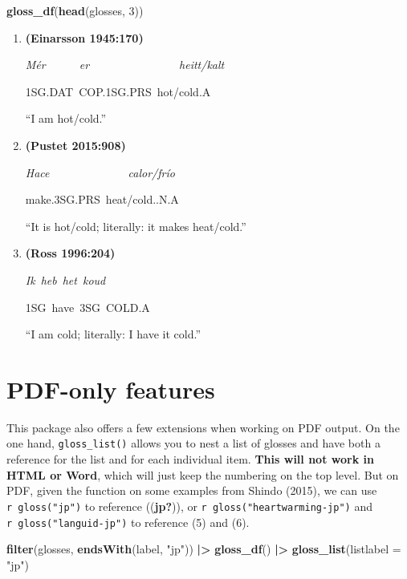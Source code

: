 \documentclass[
]{article}
\newenvironment{Shaded}{\begin{snugshade}}{\end{snugshade}}
\newcommand{\AttributeTok}[1]{\textcolor[rgb]{0.13,0.29,0.53}{#1}}
\newcommand{\DecValTok}[1]{\textcolor[rgb]{0.00,0.00,0.81}{#1}}
\newcommand{\FunctionTok}[1]{\textcolor[rgb]{0.13,0.29,0.53}{\textbf{#1}}}
\newcommand{\NormalTok}[1]{#1}
\newcommand{\SpecialCharTok}[1]{\textcolor[rgb]{0.81,0.36,0.00}{\textbf{#1}}}
\newcommand{\StringTok}[1]{\textcolor[rgb]{0.31,0.60,0.02}{#1}}
\begin{document}
\begin{Shaded}
\begin{Highlighting}[]
\FunctionTok{gloss\_df}\NormalTok{(}\FunctionTok{head}\NormalTok{(glosses, }\DecValTok{3}\NormalTok{))}
\end{Highlighting}
\end{Shaded}

\begin{enumerate}
\def\labelenumi{(\arabic{enumi})}
\setcounter{enumi}{1}
\item
  \textbf{(Einarsson 1945:170)}

  \emph{Mér}~~~~~~\emph{er}~~~~~~~~~~~~~~~~\emph{heitt/kalt}~

  1SG.DAT~COP.1SG.PRS~hot/cold.A~

  ``I am hot/cold.''
\item
  \textbf{(Pustet 2015:908)}

  \emph{Hace}~~~~~~~~~~~~~~\emph{calor/frío}~~~~~

  make.3SG.PRS~heat/cold..N.A~

  ``It is hot/cold; literally: it makes heat/cold.''
\item
  \textbf{(Ross 1996:204)}

  \emph{Ik}~\emph{heb}~\emph{het}~\emph{koud}~~

  1SG~have~3SG~COLD.A~

  ``I am cold; literally: I have it cold.''
\end{enumerate}

\hypertarget{pdf-only-features}{%
\section{PDF-only features}\label{pdf-only-features}}

This package also offers a few extensions when working on PDF output. On the one hand, \texttt{gloss\_list()} allows you to nest a list of glosses and have both a reference for the list and for each individual item. \textbf{This will not work in HTML or Word}, which will just keep the numbering on the top level. But on PDF, given the function on some examples from Shindo (2015), we can use \texttt{\textasciigrave{}r\ gloss("jp")\textasciigrave{}} to reference ((\textbf{jp?})), or \texttt{\textasciigrave{}r\ gloss("heartwarming-jp")\textasciigrave{}} and \texttt{\textasciigrave{}r\ gloss("languid-jp")\textasciigrave{}} to reference (5) and (6).

\begin{Shaded}
\begin{Highlighting}[]
\FunctionTok{filter}\NormalTok{(glosses, }\FunctionTok{endsWith}\NormalTok{(label, }\StringTok{"jp"}\NormalTok{)) }\SpecialCharTok{|\textgreater{}} 
  \FunctionTok{gloss\_df}\NormalTok{() }\SpecialCharTok{|\textgreater{}} 
  \FunctionTok{gloss\_list}\NormalTok{(}\AttributeTok{listlabel =} \StringTok{"jp"}\NormalTok{)}
\end{Highlighting}
\end{Shaded}
\end{document}

